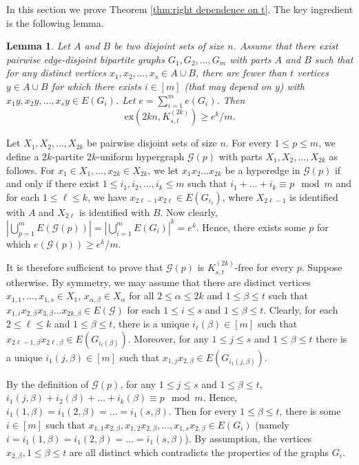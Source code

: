 \documentclass[a4paper,11pt]{article}
\makeatletter
\renewenvironment{proof}[1][\proofname] {\par\pushQED{\qed}\normalfont\topsep6\p@\@plus6\p@\relax\trivlist\item[\hskip\labelsep\bfseries#1\@addpunct{.}]\ignorespaces}{\popQED\endtrivlist\@endpefalse}
\newtheorem{lemma}[theorem]{\bf Lemma}
\theoremstyle{definition}
\def\cG{\mathcal{G}}
\def\ex{\mathrm{ex}}
\makeatother
\begin{document}
In this section we prove Theorem \ref{thm:right dependence on t}. The key ingredient is the following lemma.

\begin{lemma} \label{lem:general lower bound}
    Let $A$ and $B$ be two disjoint sets of size $n$. Assume that there exist pairwise edge-disjoint bipartite graphs $G_1,G_2,\dots,G_m$ with parts $A$ and $B$ such that for any distinct vertices $x_1,x_2,\dots,x_s\in A\cup B$, there are fewer than $t$ vertices $y\in A\cup B$ for which there exists $i\in [m]$ (that may depend on $y$) with $x_1y,x_2y,\dots,x_sy\in E(G_i)$. Let $e=\sum_{i=1}^m e(G_i)$.
    \nolinebreak Then $$\ex(2kn,K_{s,t}^{(2k)})\geq e^k/m.$$
\end{lemma}

\begin{proof}
    Let $X_1,X_2,\dots,X_{2k}$ be pairwise disjoint sets of size $n$. For every $1\leq p\leq m$, we define a $2k$-partite $2k$-uniform hypergraph $\cG(p)$ with parts $X_1,X_2,\dots,X_{2k}$ as follows. For $x_1\in X_1,\dots,x_{2k}\in X_{2k}$, we let $x_1x_2\dots x_{2k}$ be a hyperedge in $\cG(p)$ if and only if there exist $1\leq i_1,i_2,\dots,i_k\leq m$ such that $i_1+\dots+i_k \equiv p \mod m$ and for each $1\leq \ell\leq k$, we have $x_{2\ell-1}x_{2\ell}\in E(G_{i_\ell})$, where $X_{2\ell-1}$ is identified with $A$ and $X_{2\ell}$ is identified with $B$. Now clearly, $|\bigcup_{p=1}^m E(\cG(p))|=|\bigcup_{i=1}^m E(G_i)|^k=e^k$. Hence, there exists some $p$ for which $e(\cG(p))\geq e^k/m$.
    
    It is therefore sufficient to prove that $\cG(p)$ is $K_{s,t}^{(2k)}$-free for every $p$.
    Suppose otherwise. By symmetry, we may assume that there are distinct vertices $x_{1,1},\dots,x_{1,s}\in X_1$, $x_{\alpha,\beta}\in X_\alpha$ for all $2\leq \alpha\leq 2k$ and $1\leq \beta\leq t$ such that $x_{1,i}x_{2,\beta}x_{3,\beta}\dots x_{2k,\beta}\in E(\cG)$ for each $1\leq i\leq s$ and $1\leq \beta\leq t$. Clearly, for each $2\leq \ell\leq k$ and $1\leq \beta \leq t$, there is a unique $i_{\ell}(\beta)\in [m]$ such that $x_{2\ell-1,\beta}x_{2\ell,\beta}\in E(G_{i_{\ell}(\beta)})$. Moreover, for any $1\leq j\leq s$ and $1\leq \beta \leq t$ there is a unique $i_1(j,\beta)\in [m]$ such that $x_{1,j}x_{2,\beta}\in E(G_{i_1(j,\beta)})$.
    
    By the definition of $\cG(p)$, for any $1\leq j\leq s$ and $1\leq \beta\leq t$, $i_1(j,\beta)+i_2(\beta)+\dots+i_k(\beta)\equiv p \mod m$. Hence, $i_1(1,\beta)=i_1(2,\beta)=\dots =i_1(s,\beta)$. Then for every $1\leq \beta \leq t$, there is some $i\in [m]$ such that $x_{1,1}x_{2,\beta},x_{1,2}x_{2,\beta},\dots,x_{1,s}x_{2,\beta}\in E(G_i)$ (namely $i=i_1(1,\beta)=i_1(2,\beta)=\dots =i_1(s,\beta)$). By assumption, the vertices $x_{2,\beta}, 1 \le \beta \le t$ are all distinct which contradicts the properties of the graphs $G_i$.
\end{proof}
\end{document}
